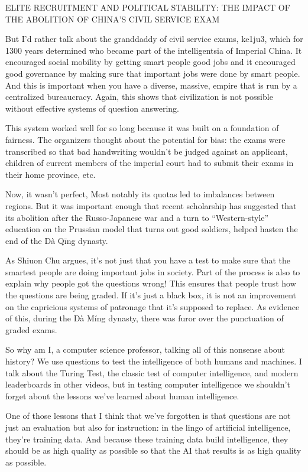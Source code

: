 ELITE RECRUITMENT AND POLITICAL STABILITY: THE IMPACT OF THE ABOLITION OF CHINA'S CIVIL SERVICE EXAM

But I’d rather talk about the granddaddy of civil service exams, ke1ju3, which for 1300 years determined who became part of the intelligentsia of Imperial China.   
It encouraged social mobility by getting smart people good jobs and it encouraged good governance by making sure that important jobs were done by smart people.  And this is important when you have a diverse, massive, empire that is run by a centralized bureaucracy.  Again, this shows that civilization is not possible without effective systems of question answering.

This system worked well for so long because it was built on a foundation of fairness.  The organizers thought about the potential for bias: the exams were transcribed so that bad handwriting wouldn’t be judged against an applicant, children of current members of the imperial court had to submit their exams in their home province, etc.  

Now, it wasn’t perfect, Most notably its quotas led to imbalances between regions.  But it was important enough that recent scholarship has suggested that its abolition after the Russo-Japanese war and a turn to “Western-style” education on the Prussian model that turns out good soldiers, helped hasten the end of the Dà Qīng dynasty.

As  Shiuon Chu argues, it’s not just that you have a test to make sure that the smartest people are doing important jobs in society.  Part of the process is also to explain why people got the questions wrong!  This ensures that people trust how the questions are being graded.  If it’s just a black box, it is not an improvement on the capricious systems of patronage that it’s supposed to replace.  As evidence of this, during the Dà Míng dynasty, there was furor over the punctuation of graded exams.

So why am I, a computer science professor, talking all of this nonsense about history?  We use questions to test the intelligence of both humans and machines.  I talk about the Turing Test, the classic test of computer intelligence, and modern leaderboards in other videos, but in testing computer intelligence we shouldn’t forget about the lessons we’ve learned about human intelligence.

One of those lessons that I think that we’ve forgotten is that questions are not just an evaluation but also for instruction: in the lingo of artificial intelligence, they’re training data.  And because these training data build intelligence, they should be as high quality as possible so that the AI that results is as high quality as possible.

